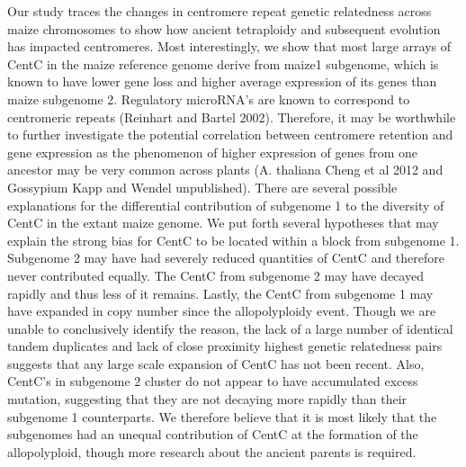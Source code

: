 Our study traces the changes in centromere repeat genetic relatedness across maize chromosomes to show how ancient tetraploidy and subsequent evolution has impacted centromeres.  Most interestingly, we show that most large arrays of CentC in the maize reference genome derive from maize1 subgenome, which is known to have lower gene loss and higher average expression of its genes than maize subgenome 2.  Regulatory microRNA’s are known to correspond to centromeric repeats (Reinhart and Bartel 2002).  Therefore, it may be worthwhile to further investigate the potential correlation between centromere retention and gene expression as the phenomenon of higher expression of genes from one ancestor may be very common across plants (A. thaliana Cheng et al 2012 and Gossypium Kapp and Wendel unpublished).   There are several possible explanations for the differential contribution of subgenome 1 to the diversity of CentC in the extant maize  genome. We put forth several hypotheses that may explain the strong bias for CentC to be located within a block from subgenome 1. Subgenome 2 may have had severely reduced quantities of CentC and therefore never contributed equally.  The CentC from subgenome 2 may have decayed rapidly and thus less of it remains.  Lastly, the CentC from subgenome 1 may have expanded in copy number since the allopolyploidy event.  Though we are unable to conclusively identify the reason, the lack of a large number of identical tandem duplicates  and lack of close proximity highest genetic relatedness pairs suggests that any large scale expansion of CentC has not been recent.  Also, CentC’s in subgenome 2 cluster do not appear to have accumulated excess mutation, suggesting that they are not decaying more rapidly than their subgenome 1 counterparts.  We therefore believe that it is most likely that the subgenomes had an unequal contribution of CentC at the formation of the allopolyploid, though more research about the ancient parents is required.  

